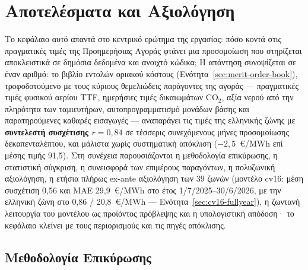 
\chapter{Αποτελέσματα και Αξιολόγηση}
\label{ch:results}

Το κεφάλαιο αυτό απαντά στο κεντρικό ερώτημα της εργασίας: πόσο κοντά στις πραγματικές τιμές της Προημερήσιας Αγοράς φτάνει μια προσομοίωση που στηρίζεται αποκλειστικά σε δημόσια δεδομένα και ανοιχτό κώδικα; Η απάντηση συνοψίζεται σε έναν αριθμό: το βιβλίο εντολών οριακού κόστους (Ενότητα~\ref{sec:merit-order-book}), τροφοδοτούμενο με τους κύριους θεμελιώδεις παράγοντες της αγοράς --- πραγματικές τιμές φυσικού αερίου TTF, ημερήσιες τιμές δικαιωμάτων CO$_2$, αξία νερού από την πληρότητα των ταμιευτήρων, αυτοπρογραμματισμό μονάδων βάσης και παρατηρούμενες καθαρές εισαγωγές --- αναπαράγει τις τιμές της ελληνικής ζώνης με \textbf{συντελεστή συσχέτισης $r = 0{,}84$} σε τέσσερις συνεχόμενους μήνες προσομοίωσης δεκαπενταλέπτου, και μάλιστα χωρίς συστηματική απόκλιση ($-2{,}5$~€/MWh επί μέσης τιμής 91{,}5). Στη συνέχεια παρουσιάζονται η μεθοδολογία επικύρωσης, η στατιστική σύγκριση, η συνεισφορά των επιμέρους παραγόντων, η πολυζωνική αξιολόγηση, η ετήσια πλήρως ex-ante αξιολόγηση των 39 ζωνών (μοντέλο cv16: μέση συσχέτιση 0,56 και MAE 29,9~€/MWh στο έτος 1/7/2025--30/6/2026, με την ελληνική ζώνη στο 0,86 / 20,8~€/MWh --- Ενότητα~\ref{sec:cv16-fullyear}), η ζωντανή λειτουργία του μοντέλου ως προϊόντος πρόβλεψης και η υπολογιστική απόδοση· το κεφάλαιο κλείνει με τους περιορισμούς και τις πηγές απόκλισης.


\section{Μεθοδολογία Επικύρωσης}
\label{sec:validation-methodology}

